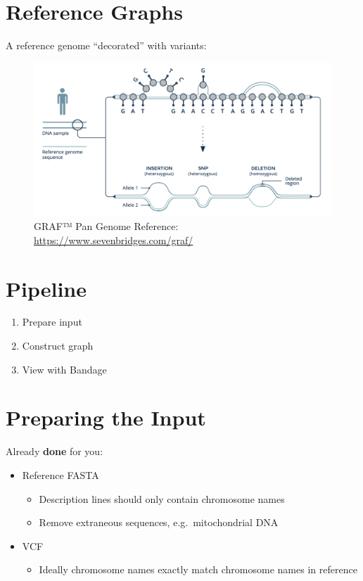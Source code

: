 \documentclass[
]{book}
\providecommand{\tightlist}{%
  \setlength{\itemsep}{0pt}\setlength{\parskip}{0pt}}
\begin{document}
\hypertarget{reference-graphs}{%
\section{Reference Graphs}\label{reference-graphs}}

A reference genome ``decorated'' with variants:

\begin{figure}
\centering
\includegraphics[width=1\textwidth,height=\textheight]{./Figures/GRAF.png}
\caption{GRAF™ Pan Genome Reference: \url{https://www.sevenbridges.com/graf/}}
\end{figure}

\hypertarget{pipeline}{%
\section{Pipeline}\label{pipeline}}

\begin{enumerate}
\def\labelenumi{\arabic{enumi}.}
\tightlist
\item
  Prepare input
\item
  Construct graph
\item
  View with Bandage
\end{enumerate}

\hypertarget{preparing-the-input}{%
\section{Preparing the Input}\label{preparing-the-input}}

Already \textbf{done} for you:

\begin{itemize}
\tightlist
\item
  Reference FASTA

  \begin{itemize}
  \tightlist
  \item
    Description lines should only contain chromosome names
  \item
    Remove extraneous sequences, e.g.~mitochondrial DNA
  \end{itemize}
\item
  VCF

  \begin{itemize}
  \tightlist
  \item
    Ideally chromosome names exactly match chromosome names in reference
  \end{itemize}
\end{itemize}
\end{document}
